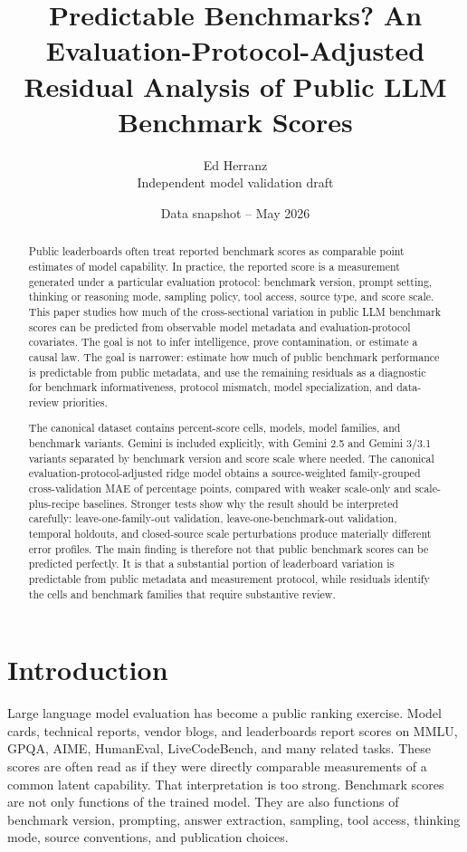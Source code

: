 \documentclass[11pt]{article}
\title{Predictable Benchmarks? An Evaluation-Protocol-Adjusted Residual Analysis of Public LLM Benchmark Scores}
\author{Ed Herranz\\Independent model validation draft}
\date{Data snapshot -- May 2026}
\begin{document}
\maketitle

\begin{abstract}
Public leaderboards often treat reported benchmark scores as comparable point estimates of model capability.  In practice, the reported score is a measurement generated under a particular evaluation protocol: benchmark version, prompt setting, thinking or reasoning mode, sampling policy, tool access, source type, and score scale.  This paper studies how much of the cross-sectional variation in public LLM benchmark scores can be predicted from observable model metadata and evaluation-protocol covariates.  The goal is not to infer intelligence, prove contamination, or estimate a causal law.  The goal is narrower: estimate how much of public benchmark performance is predictable from public metadata, and use the remaining residuals as a diagnostic for benchmark informativeness, protocol mismatch, model specialization, and data-review priorities.

The canonical dataset contains \VSixCanonicalCells{} percent-score cells, \VSixCanonicalModels{} models, \VSixCanonicalFamilies{} model families, and \VSixCanonicalBenchmarks{} benchmark variants.  Gemini is included explicitly, with Gemini 2.5 and Gemini 3/3.1 variants separated by benchmark version and score scale where needed.  The canonical evaluation-protocol-adjusted ridge model obtains a source-weighted family-grouped cross-validation MAE of \VSixWeightedMAE{} percentage points, compared with weaker scale-only and scale-plus-recipe baselines.  Stronger tests show why the result should be interpreted carefully: leave-one-family-out validation, leave-one-benchmark-out validation, temporal holdouts, and closed-source scale perturbations produce materially different error profiles.  The main finding is therefore not that public benchmark scores can be predicted perfectly.  It is that a substantial portion of leaderboard variation is predictable from public metadata and measurement protocol, while residuals identify the cells and benchmark families that require substantive review.
\end{abstract}

\section{Introduction}
Large language model evaluation has become a public ranking exercise.  Model cards, technical reports, vendor blogs, and leaderboards report scores on MMLU, GPQA, AIME, HumanEval, LiveCodeBench, and many related tasks.  These scores are often read as if they were directly comparable measurements of a common latent capability.  That interpretation is too strong.  Benchmark scores are not only functions of the trained model.  They are also functions of benchmark version, prompting, answer extraction, sampling, tool access, thinking mode, source conventions, and publication choices.
\end{document}
